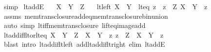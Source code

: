 \begin{isabellebody}
\ simp%
\endisatagproof
{\isafoldproof}%
%
\isadelimproof
\isanewline
%
\endisadelimproof
\isanewline
{}\isamarkupfalse%
\ lt{\isacharunderscore}{\kern0pt}addE{\isacharcolon}{\kern0pt}\isanewline
\ \ \ {\isachardoublequoteopen}X\ {\isacharless}{\kern0pt}\ Y\ {\isacharplus}{\kern0pt}\ Z{\isachardoublequoteclose}\isanewline
\ \ \ {\isacharparenleft}{\kern0pt}lt{\isacharunderscore}{\kern0pt}left{\isacharparenright}{\kern0pt}\ {\isachardoublequoteopen}X\ {\isacharless}{\kern0pt}\ Y{\isachardoublequoteclose}\ {\isacharbar}{\kern0pt}\ {\isacharparenleft}{\kern0pt}lt{\isacharunderscore}{\kern0pt}eq{\isacharparenright}{\kern0pt}\ z\ \ {\isachardoublequoteopen}z\ {\isacharless}{\kern0pt}\ Z{\isachardoublequoteclose}\ {\isachardoublequoteopen}X\ {\isacharequal}{\kern0pt}\ Y\ {\isacharplus}{\kern0pt}\ z{\isachardoublequoteclose}\isanewline
%
\isadelimproof
\ \ %
\endisadelimproof
%
\isatagproof
{}\isamarkupfalse%
\ assms\ mem{\isacharunderscore}{\kern0pt}trans{\isacharunderscore}{\kern0pt}closure{\isacharunderscore}{\kern0pt}add{\isacharunderscore}{\kern0pt}eq{\isacharunderscore}{\kern0pt}mem{\isacharunderscore}{\kern0pt}trans{\isacharunderscore}{\kern0pt}closure{\isacharunderscore}{\kern0pt}bin{\isacharunderscore}{\kern0pt}union\isanewline
\ \ \isamarkupfalse%
\ {\isacharparenleft}{\kern0pt}auto\ simp{\isacharcolon}{\kern0pt}\ lt{\isacharunderscore}{\kern0pt}iff{\isacharunderscore}{\kern0pt}mem{\isacharunderscore}{\kern0pt}trans{\isacharunderscore}{\kern0pt}closure\ lift{\isacharunderscore}{\kern0pt}eq{\isacharunderscore}{\kern0pt}image{\isacharunderscore}{\kern0pt}add{\isacharparenright}{\kern0pt}%
\endisatagproof
{\isafoldproof}%
%
\isadelimproof
\isanewline
%
\endisadelimproof
\isanewline
{}\isamarkupfalse%
\ lt{\isacharunderscore}{\kern0pt}add{\isacharunderscore}{\kern0pt}iff{\isacharunderscore}{\kern0pt}lt{\isacharunderscore}{\kern0pt}or{\isacharunderscore}{\kern0pt}lt{\isacharunderscore}{\kern0pt}eq{\isacharcolon}{\kern0pt}\ {\isachardoublequoteopen}X\ {\isacharless}{\kern0pt}\ Y\ {\isacharplus}{\kern0pt}\ Z\ {\isasymlongleftrightarrow}\ X\ {\isacharless}{\kern0pt}\ Y\ {\isasymor}\ {\isacharparenleft}{\kern0pt}{\isasymexists}z{\isachardot}{\kern0pt}\ z\ {\isacharless}{\kern0pt}\ Z\ {\isasymand}\ X\ {\isacharequal}{\kern0pt}\ Y\ {\isacharplus}{\kern0pt}\ z{\isacharparenright}{\kern0pt}{\isachardoublequoteclose}\isanewline
%
\isadelimproof
\ \ %
\endisadelimproof
%
\isatagproof
{}\isamarkupfalse%
\ {\isacharparenleft}{\kern0pt}blast\ intro{\isacharcolon}{\kern0pt}\ lt{\isacharunderscore}{\kern0pt}add{\isacharunderscore}{\kern0pt}if{\isacharunderscore}{\kern0pt}lt{\isacharunderscore}{\kern0pt}left\ add{\isacharunderscore}{\kern0pt}lt{\isacharunderscore}{\kern0pt}add{\isacharunderscore}{\kern0pt}if{\isacharunderscore}{\kern0pt}lt{\isacharunderscore}{\kern0pt}right\ elim{\isacharcolon}{\kern0pt}\ lt{\isacharunderscore}{\kern0pt}addE{\isacharparenright}{\kern0pt}%

\end{isabellebody}
